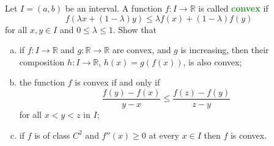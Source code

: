 \documentclass[11pt]{scrartcl}
\providecommand{\RR}{\mathbb R}
\providecommand{\ii}{\item}
\providecommand{\vocab}[1]{{\textbf{\textcolor{ForestGreen}{#1}}}}
\begin{document}
\pagebreak
\begin{problem}
	Let $I = (a, b)$ be an interval.
	A function $f\colon I\to\RR$ is called \vocab{convex} if
	\[f(\lambda x + (1-\lambda) y) \le \lambda f(x) + (1-\lambda) f(y)\]
	for all $x,y\in I$ and $0\le\lambda\le 1$. Show that
	\begin{enumerate}[(a)]
		\ii if $f\colon I\to\RR$ and $g\colon\RR\to\RR$ are convex,
		and $g$ is increasing, then their composition $h\colon I\to\RR$,
		$h(x) = g(f(x))$, is also convex;
		\ii the function $f$ is convex if and only if
		\[\frac{f(y) - f(x)}{y - x} \le \frac{f(z) - f(y)}{z - y}\]
		for all $x < y < z$ in $I$;
		\ii if $f$ is of class $C^2$ and $f''(x) \ge 0$ at every $x\in I$
		then $f$ is convex.
	\end{enumerate}
\end{problem}
\end{document}
